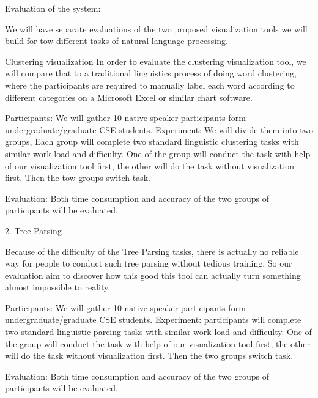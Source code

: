 Evaluation of the system:

We will have separate evaluations of the two proposed visualization tools we will build for tow different tasks of natural language processing.

Clustering visualization
In order to evaluate the clustering visualization tool, we will compare that to a traditional linguistics  process of doing word clustering, where the participants are required to manually label each word according to different categories on a Microsoft Excel or similar chart software.

Participants: We will gather 10 native speaker participants form undergraduate/graduate CSE students.
Experiment: We will divide them into two groups, Each group will complete two standard linguistic clustering tasks with similar work load and difficulty. One of the group will conduct the task with help of our visualization tool first, the other will do the task without visualization first. Then the tow groups switch task.

Evaluation: Both time consumption and accuracy of the two groups of participants will be evaluated.

2. Tree Parsing

Because of the difficulty of the Tree Parsing tasks, there is actually no reliable way for people to conduct such tree parsing without tedious training. So our evaluation aim to discover how this good this tool can actually turn something almost impossible to reality.

Participants: We will gather 10 native speaker participants form undergraduate/graduate CSE students.
Experiment: participants will complete two standard linguistic parcing tasks with similar work load and difficulty. One of the group will conduct the task with help of our visualization tool first, the other will do the task without visualization first. Then the two groups switch task.

Evaluation: Both time consumption and accuracy of the two groups of participants will be evaluated.